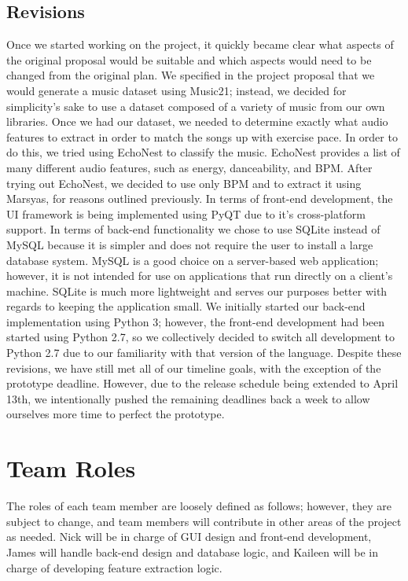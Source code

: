 \documentclass{article}
\begin{document}
\subsection{Revisions}
Once we started working on the project, it quickly became clear what aspects of the original proposal would be suitable and which aspects would need to be changed from the original plan. We specified in the project proposal that we would generate a music dataset using Music21; instead, we decided for simplicity's sake to use a dataset composed of a variety of music from our own libraries. Once we had our dataset, we needed to determine exactly what audio features to extract in order to match the songs up with exercise pace. In order to do this, we tried using EchoNest to classify the music. EchoNest provides a list of many different audio features, such as energy, danceability, and BPM. After trying out EchoNest, we decided to use only BPM and to extract it using Marsyas, for reasons outlined previously. In terms of front-end development, the UI framework is being implemented using PyQT due to it’s cross-platform support. In terms of back-end functionality we chose to use SQLite instead of MySQL because it is simpler and does not require the user to install a large database system. MySQL is a good choice on a server-based web application; however, it is not intended for use on applications that run directly on a client’s machine. SQLite is much more lightweight and serves our purposes better with regards to keeping the application small. We initially started our back-end implementation using Python 3; however, the front-end development had been started using Python 2.7, so we collectively decided to switch all development to Python 2.7 due to our familiarity with that version of the language. Despite these revisions, we have still met all of our timeline goals, with the exception of the prototype deadline. However, due to the release schedule being extended to April 13th, we intentionally pushed the remaining deadlines back a week to allow ourselves more time to perfect the prototype.

\section{Team Roles}
The roles of each team member are loosely defined as follows; however, they are subject to change, and team members will contribute in other areas of the project as needed. Nick will be in charge of GUI design and front-end development, James will handle back-end design and database logic, and Kaileen will be in charge of developing feature extraction logic.
\end{document}
